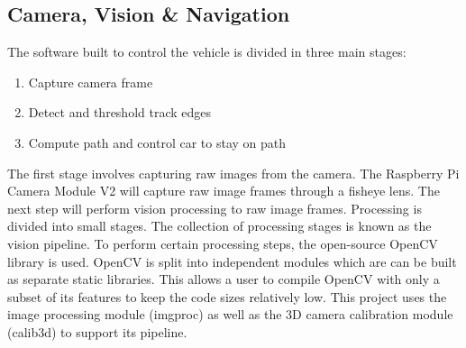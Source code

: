 \documentclass{article}
\begin{document}

\subsection{Camera, Vision \& Navigation}

The software built to control the vehicle is divided in three main stages:

\begin{enumerate}
\item Capture camera frame
\item Detect and threshold track edges
\item Compute path and control car to stay on path
\end{enumerate}

The first stage involves capturing raw images from the camera. The Raspberry Pi Camera Module V2 will capture raw image frames through a fisheye lens.
The next step will perform vision processing to raw image frames. Processing is divided into small stages. The collection of processing stages is known as the vision pipeline. To perform certain processing steps, the open-source OpenCV library is used. OpenCV is split into independent modules which are can be built as separate static libraries. This allows a user to compile OpenCV with only a subset of its features to keep the code sizes relatively low. This project uses the image processing module (imgproc) as well as the 3D camera calibration module (calib3d) to support its pipeline.
\end{document}
